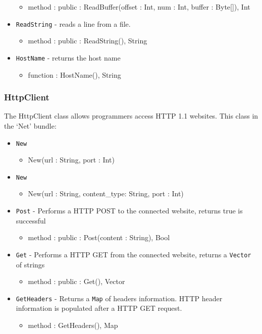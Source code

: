 \documentclass[12pt]{article}
\begin{document}
\begin{itemize}
\begin{itemize}
  \item method : public : ReadBuffer(offset : Int, num : Int, buffer : Byte[]), Int
  \end{itemize}
\item \texttt{ReadString} - reads a line from a file.
  \begin{itemize}
  \item method : public : ReadString(), String
  \end{itemize}
\item \texttt{HostName} - returns the host name
  \begin{itemize}
  \item function : HostName(), String
  \end{itemize}
\end{itemize}

\subsubsection{HttpClient}
The HttpClient class allows programmers access HTTP 1.1 websites.
This class in the `Net' bundle:
\begin{itemize}
\item \texttt{New}
  \begin{itemize}
  \item New(url : String, port : Int)
  \end{itemize}
\item \texttt{New}
  \begin{itemize}
  \item New(url : String, content\_type: String, port : Int)
  \end{itemize}
\item \texttt{Post} - Performs a HTTP POST to the connected website,
  returns true is successful
  \begin{itemize}
  \item method : public : Post(content : String), Bool
  \end{itemize}
\item \texttt{Get} - Performs a HTTP GET from the connected website,
  returns a \texttt{Vector} of strings
  \begin{itemize}
  \item method : public : Get(), Vector
  \end{itemize}
\item \texttt{GetHeaders} - Returns a \texttt{Map} of headers
  information.  HTTP header information is populated after a HTTP GET
  request.
  \begin{itemize}
  \item method : GetHeaders(), Map
  \end{itemize}
\end{itemize}
\end{document}
